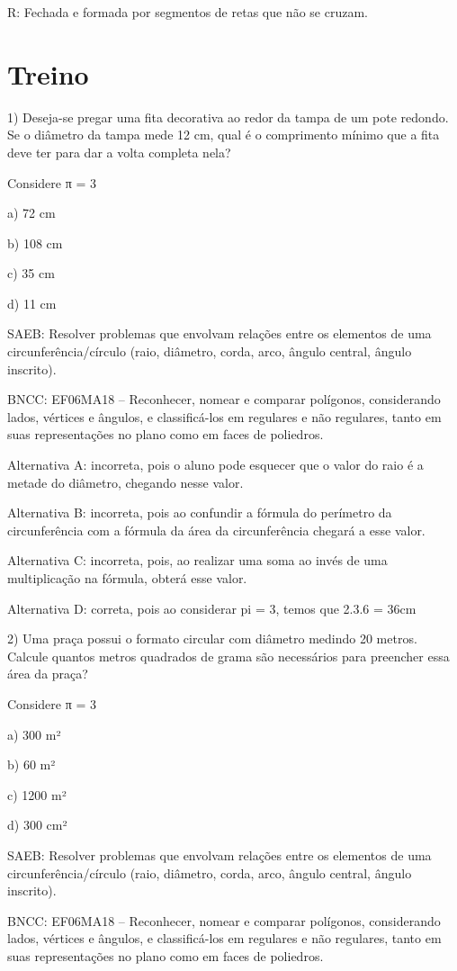 R: Fechada e formada por segmentos de retas que não se cruzam.

\section{Treino}

1) Deseja-se pregar uma fita decorativa ao redor da tampa de um pote
redondo. Se o diâmetro da tampa mede 12 cm, qual é o comprimento mínimo
que a fita deve ter para dar a volta completa nela?

Considere π = 3

a) 72 cm

b) 108 cm

c) 35 cm

d) 11 cm

SAEB: Resolver problemas que envolvam relações entre os elementos de uma
circunferência/círculo (raio, diâmetro, corda, arco, ângulo central,
ângulo inscrito).

BNCC: EF06MA18 -- Reconhecer, nomear e comparar polígonos, considerando
lados, vértices e ângulos, e classificá-los em regulares e não
regulares, tanto em suas representações no plano como em faces de
poliedros.

Alternativa A: incorreta, pois o aluno pode esquecer que o valor do raio
é a metade do diâmetro, chegando nesse valor.

Alternativa B: incorreta, pois ao confundir a fórmula do perímetro da
circunferência com a fórmula da área da circunferência chegará a esse
valor.

Alternativa C: incorreta, pois, ao realizar uma soma ao invés de uma
multiplicação na fórmula, obterá esse valor.

Alternativa D: correta, pois ao considerar pi = 3, temos que 2.3.6 =
36cm

2) Uma praça possui o formato circular com diâmetro medindo 20 metros.
Calcule quantos metros quadrados de grama são necessários para preencher
essa área da praça?

Considere π = 3

a) 300 m²

b) 60 m²

c) 1200 m²

d) 300 cm²

SAEB: Resolver problemas que envolvam relações entre os elementos de uma
circunferência/círculo (raio, diâmetro, corda, arco, ângulo central,
ângulo inscrito).

BNCC: EF06MA18 -- Reconhecer, nomear e comparar polígonos, considerando
lados, vértices e ângulos, e classificá-los em regulares e não
regulares, tanto em suas representações no plano como em faces de
poliedros.

